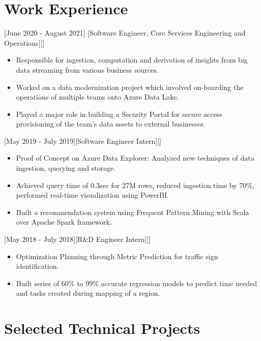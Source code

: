 \documentclass{article}
\begin{document}
\section{Work Experience}

[June 2020 - August 2021]
[Software Engineer, Core Services Engineering and Operations][]

\begin{itemize}
\item Responsible for ingestion, computation and derivation of insights from big data streaming from various business sources.
\item Worked on a data modernization project which involved on-boarding the operations of multiple teams onto Azure Data Lake.
\item Played a major role in building a Security Portal for secure access provisioning of the team's data assets to external businesses.
\end{itemize}

[May 2019 - July 2019][Software Engineer Intern][]

\begin{itemize}
\item Proof of Concept on Azure Data Explorer: Analyzed new techniques of data ingestion, querying and storage. 
\item Achieved query time of 0.3sec for 27M rows, reduced ingestion time by 70\%, performed real-time visualization using PowerBI.
\item Built a recommendation system using Frequent Pattern Mining with Scala over Apache Spark framework.

\end{itemize}

[May 2018 - July 2018][R\&D Engineer Intern][]

\begin{itemize}
\item Optimization Planning through Metric Prediction for traffic sign identification. 
\item Built series of 60\% to 99\% accurate regression models to predict time needed and tasks created during mapping of a region.

\end{itemize}


\section{Selected Technical Projects}
\end{document}
